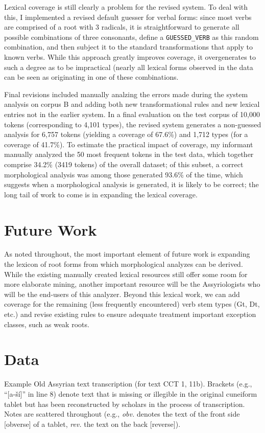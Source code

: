 \documentclass[11pt,letterpaper]{article}
\begin{document}
Lexical coverage is still clearly a problem for the revised system.  To deal with this, I implemented a revised default guesser for verbal forms: since most verbs are comprised of a root with 3 radicals, it is straightforward to generate all possible combinations of three consonants, define a \texttt{GUESSED\_VERB} as this random combination, and then subject it to the standard transformations that apply to known verbs.  While this approach greatly improves coverage, it overgenerates to such a degree as to be impractical (nearly all lexical forms observed in the data can be seen as originating in one of these combinations.

Final revisions included manually analzing the errors made during the system analysis on corpus B and adding both new transformational rules and new lexical entries not in the earlier system.  In a final evaluation on the test corpus of 10,000 tokens (corresponding to 4,101 types), the revised system generates a non-guessed analysis for 6,757 tokens (yielding a coverage of 67.6\%) and 1,712 types (for a coverage of 41.7\%).  To estimate the practical impact of coverage, my informant manually analyzed the 50 most frequent tokens in the test data, which together comprise 34.2\% (3419 tokens) of the overall dataset; of this subset, a correct morphological analysis was among those generated 93.6\% of the time, which suggests when a morphological analysis is generated, it is likely to be correct; the long tail of work to come is in expanding the lexical coverage.


\section{Future Work}

As noted throughout, the most important element of future work is expanding the lexicon of root forms from which morphological analyzes can be derived.  While the existing manually created lexical resources still offer some room for more elaborate mining, another important resource will be the Assyriologists who will be the end-users of this analyzer.     Beyond this lexical work, we can add coverage for the remaining (less frequently encountered) verb stem types (Gt, Dt, etc.) and revise existing rules to ensure adequate treatment important exception classes, such as weak roots.

\appendix
\section{Data}
\label{appendixData}
Example Old Assyrian text transcription (for text CCT 1, 11b). Brackets (e.g., ``[a-ší]'' in line 8) denote text that is missing or illegible in the original cuneiform tablet but has been reconstructed by scholars in the process of transcription.  Notes are scattered throughout (e.g., \emph{obv.} denotes the text of the front side [obverse] of a tablet, \emph{rev.} the text on the back [reverse]).
\end{document}
